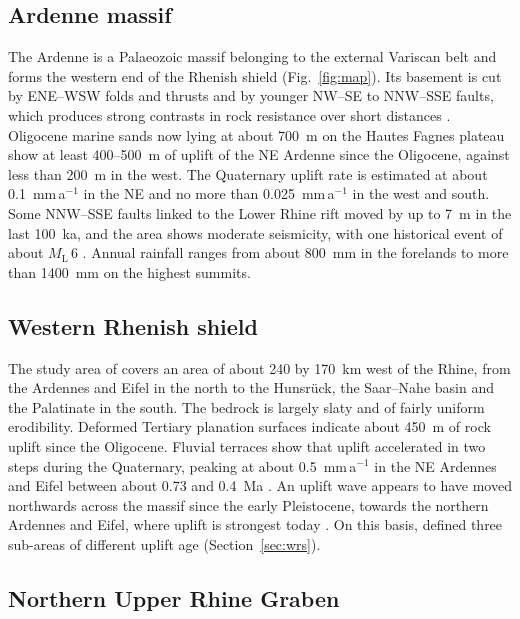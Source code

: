 \documentclass[10pt,a4paper,twocolumn]{article}
\begin{document}
\subsection{Ardenne massif}

The Ardenne is a Palaeozoic massif belonging to the external Variscan belt and forms the western end
of the Rhenish shield (Fig.~\ref{fig:map}). Its basement is cut by ENE--WSW folds and thrusts and by
younger NW--SE to NNW--SSE faults, which produces strong contrasts in rock resistance over short
distances \citep{Demoulin1998}. Oligocene marine sands now lying at about 700~m on the Hautes Fagnes
plateau show at least 400--500~m of uplift of the NE Ardenne since the Oligocene, against less than
200~m in the west. The Quaternary uplift rate is estimated at about 0.1~mm\,a$^{-1}$ in the NE and no
more than 0.025~mm\,a$^{-1}$ in the west and south. Some NNW--SSE faults linked to the Lower Rhine rift
moved by up to 7~m in the last 100~ka, and the area shows moderate seismicity, with one historical event of about $M_\mathrm{L}$\,6 \citep{Demoulin1998}. Annual rainfall ranges from about
800~mm in the forelands to more than 1400~mm on the highest summits.

\subsection{Western Rhenish shield}

The study area of \citet{Demoulin2011} covers an area of about 240 by 170~km west of the Rhine, from the
Ardennes and Eifel in the north to the Hunsrück, the Saar--Nahe basin and the Palatinate in the south.
The bedrock is largely slaty and of fairly uniform erodibility. Deformed Tertiary planation surfaces
indicate about 450~m of rock uplift since the Oligocene. Fluvial terraces show that uplift accelerated
in two steps during the Quaternary, peaking at about 0.5~mm\,a$^{-1}$ in the NE Ardennes and Eifel
between about 0.73 and 0.4~Ma \citep{VanBalen2000,Demoulin2011}. An uplift wave appears to
have moved northwards across the massif since the early Pleistocene, towards the northern Ardennes and
Eifel, where uplift is strongest today \citep{DemoulinHallot2009}. On this basis, \citet{Demoulin2011} defined three sub-areas of different uplift age
(Section~\ref{sec:wrs}).

\subsection{Northern Upper Rhine Graben}
\end{document}
